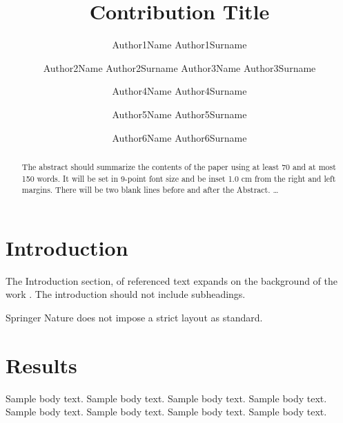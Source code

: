 \documentclass{svproc}
\begin{document}
\mainmatter              %
%
\title{Contribution Title}
%
%
\author{Author1Name Author1Surname \and Author2Name Author2Surname
Author3Name Author3Surname \and Author4Name Author4Surname \and Author5Name Author5Surname \and Author6Name Author6Surname}
%
%


\maketitle              %

\begin{abstract}
The abstract should summarize the contents of the paper
using at least 70 and at most 150 words. It will be set in 9-point
font size and be inset 1.0 cm from the right and left margins.
There will be two blank lines before and after the Abstract. \dots
\end{abstract}
%
\section{Introduction}\label{sec1}
%
The Introduction section, of referenced text \cite{bib1} expands on the background of the work . The introduction should not include subheadings.

Springer Nature does not impose a strict layout as standard. 

\section{Results}\label{sec2}

Sample body text. Sample body text. Sample body text. Sample body text. Sample body text. Sample body text. Sample body text. Sample body text.
\end{document}
